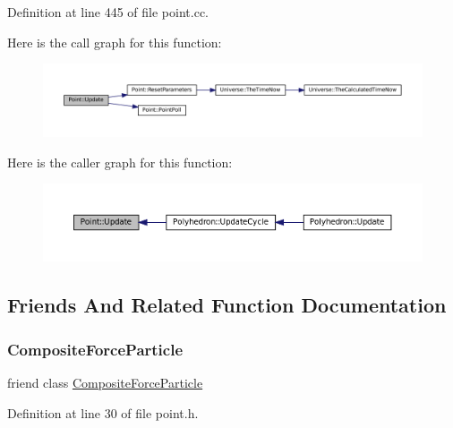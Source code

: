 Definition at line 445 of file point.\+cc.

Here is the call graph for this function\+:\nopagebreak
\begin{figure}[H]
\begin{center}
\leavevmode
\includegraphics[width=350pt]{class_point_a7ad2d1933410012c59bffbd4ac611279_cgraph}
\end{center}
\end{figure}
Here is the caller graph for this function\+:\nopagebreak
\begin{figure}[H]
\begin{center}
\leavevmode
\includegraphics[width=350pt]{class_point_a7ad2d1933410012c59bffbd4ac611279_icgraph}
\end{center}
\end{figure}


\subsection{Friends And Related Function Documentation}
\mbox{\label{class_point_a9bc6eb2a4c20ce83728a7c9a31b91f19}} 
\subsubsection{\texorpdfstring{Composite\+Force\+Particle}{CompositeForceParticle}}
{\footnotesize\ttfamily friend class \mbox{\hyperlink{class_composite_force_particle}{Composite\+Force\+Particle}}\hspace{0.3cm}{\ttfamily [friend]}}



Definition at line 30 of file point.\+h.

\mbox{\label{class_point_a6e57500586e9cd366f5cf76ea0299957}} 
